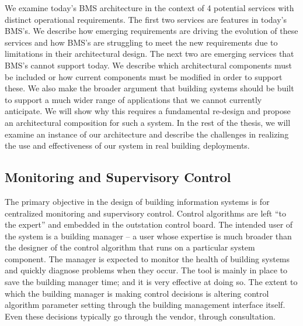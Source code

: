 We examine today's BMS architecture in the context of 4 potential services with distinct operational requirements. %
The first two services are features in today's BMS's.  
We describe how emerging requirements are driving the evolution of these
services and how BMS's are struggling to meet the new requirements due to limitations in their architectural design.
The next two are emerging services that BMS's cannot support today.  We describe which architectural components must be included
or how current components must be modified in order to support these.  We also make the broader argument that 
building systems should be built to support a much wider range of applications that we cannot currently anticipate.
We will show why this requires a fundamental re-design and propose an architectural composition for such a system.
In the rest of the thesis, we will examine an instance of our architecture and describe the challenges in realizing
the use and effectiveness of our system in real building deployments.


\subsection{Monitoring and Supervisory Control}
The primary objective in the design of building information systems is for centralized monitoring and supervisory
control.  Control algorithms are left ``to the expert'' and embedded in the outstation control board.  The intended
user of the system is a building manager -- a user whose expertise is much broader than the designer of the control
algorithm that runs on a particular system component.
The manager is expected to monitor the health of building systems and quickly diagnose problems when they occur.  The tool
is mainly in place to save the building manager time; and it is very effective at doing so.  The extent to which 
the building manager is making control decisions is altering control algorithm parameter setting through
the building management interface itself.  Even these decisions typically go through the vendor, through consultation.

